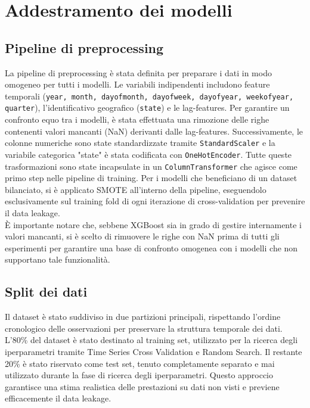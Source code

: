 \documentclass[a4paper,12pt]{report}
\begin{document}
	\section{Addestramento dei modelli}
	
	\subsection{Pipeline di preprocessing}
	La pipeline di preprocessing è stata definita per preparare i dati in modo omogeneo per tutti i modelli. Le variabili indipendenti includono feature temporali (\texttt{year, month, dayofmonth, dayofweek, dayofyear, weekofyear, quarter}), l'identificativo geografico (\texttt{state}) e le lag-features. Per garantire un confronto equo tra i modelli, è stata effettuata una rimozione delle righe contenenti valori mancanti (NaN) derivanti dalle lag-features. Successivamente, le colonne numeriche sono state standardizzate tramite \texttt{StandardScaler} e la variabile categorica "state" è stata codificata con \texttt{OneHotEncoder}. Tutte queste trasformazioni sono state incapsulate in un \texttt{ColumnTransformer} che agisce come primo step nelle pipeline di training. Per i modelli che beneficiano di un dataset bilanciato, si è applicato SMOTE all'interno della pipeline, eseguendolo esclusivamente sul training fold di ogni iterazione di cross-validation per prevenire il data leakage. \\
	È importante notare che, sebbene XGBoost sia in grado di gestire internamente i valori mancanti, si è scelto di rimuovere le righe con NaN prima di tutti gli esperimenti per garantire una base di confronto omogenea con i modelli che non supportano tale funzionalità.
	
	\subsection{Split dei dati}
	Il dataset è stato suddiviso in due partizioni principali, rispettando l'ordine cronologico delle osservazioni per preservare la struttura temporale dei dati. L'80\% del dataset è stato destinato al training set, utilizzato per la ricerca degli iperparametri tramite Time Series Cross Validation e Random Search. Il restante 20\% è stato riservato come test set, tenuto completamente separato e mai utilizzato durante la fase di ricerca degli iperparametri. Questo approccio garantisce una stima realistica delle prestazioni su dati non visti e previene efficacemente il data leakage.
	
\end{document}
